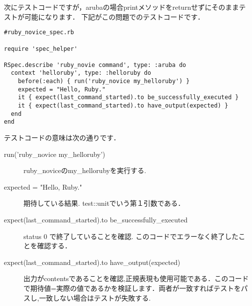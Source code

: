 次にテストコードですが，arubaの場合printメソッドをreturnせずにそのままテストが可能になります．
下記がこの問題でのテストコードです．
\begin{lstlisting}[style=customRuby,basicstyle={\scriptsize\ttfamily}]
#ruby_novice_spec.rb

require 'spec_helper'

RSpec.describe 'ruby_novie command', type: :aruba do 
  context 'helloruby', type: :helloruby do
    before(:each) { run('ruby_novice my_helloruby') }
    expected = "Hello, Ruby."
    it { expect(last_command_started).to be_successfully_executed }
    it { expect(last_command_started).to have_output(expected) }
  end
end
\end{lstlisting}
テストコードの意味は次の通りです．
\begin{description}
\item[run('ruby\_novice my\_helloruby')]  ruby\_noviceのmy\_hellorubyを実行する.

\item[expected = "Hello, Ruby."]  期待している結果. test::unitでいう第１引数である．

\item[expect(last\_command\_started).to be\_successfully\_executed]  status 0 で終了していることを確認. このコードでエラーなく終了したことを確認する．

\item[expect(last\_command\_started).to have\_output(expected)]  出力がcontentsであることを確認,正規表現も使用可能である．このコードで期待値=実際の値であるかを検証します．両者が一致すればテストをパスし,一致しない場合はテストが失敗する.

\end{description}
